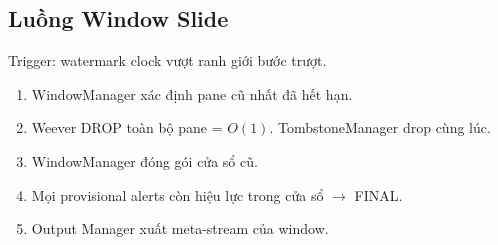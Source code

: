\subsection{Luồng Window Slide}

Trigger: watermark clock vượt ranh giới bước trượt.

\begin{enumerate}
  \item WindowManager xác định pane cũ nhất đã hết hạn.
  \item Weever DROP toàn bộ pane = $O(1)$. TombstoneManager drop cùng lúc.
  \item WindowManager đóng gói cửa sổ cũ.
  \item Mọi provisional alerts còn hiệu lực trong cửa sổ $\rightarrow$ FINAL.
  \item Output Manager xuất meta-stream của window.
\end{enumerate}
